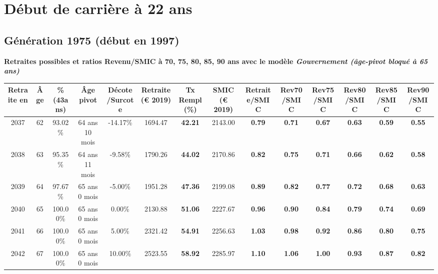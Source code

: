  \addto{\captionsenglish}{ \renewcommand{\mtctitle}{}} \setcounter{minitocdepth}{2} 
 \minitoc \newpage 

\section{Début de carrière à 22 ans} 

\subsection{Génération 1975 (début en 1997)} 

{\bf \noindent Retraites possibles et ratios Revenu/SMIC à 70, 75, 80, 85, 90 ans avec le modèle \emph{Gouvernement (âge-pivot bloqué à 65 ans)}}  
 
\begin{adjustbox}{max width=\textwidth} 
\begin{tabular}[htb]{|c|c||c|c|c||c|c||c||c|c|c|c|c|c|} 
\hline 
 Retraite en &  Âge &  \%(43ans) &  Âge pivot &  Décote/Surcote &  Retraite (\euro{} 2019) &  Tx Rempl(\%) &  SMIC (\euro{} 2019) &  Retraite/SMIC &  Rev70/SMIC &  Rev75/SMIC &  Rev80/SMIC &  Rev85/SMIC &  Rev90/SMIC \\ 
\hline \hline 
 2037 &  62 &  93.02\% &  64 ans 10 mois &  -14.17\% &  1694.47 &  {\bf 42.21} &  2143.00 &  {\bf {\color{red} 0.79}} &  {\bf {\color{red} 0.71}} &  {\bf {\color{red} 0.67}} &  {\bf {\color{red} 0.63}} &  {\bf {\color{red} 0.59}} &  {\bf {\color{red} 0.55}} \\ 
\hline 
 2038 &  63 &  95.35\% &  64 ans 11 mois &  -9.58\% &  1790.26 &  {\bf 44.02} &  2170.86 &  {\bf {\color{red} 0.82}} &  {\bf {\color{red} 0.75}} &  {\bf {\color{red} 0.71}} &  {\bf {\color{red} 0.66}} &  {\bf {\color{red} 0.62}} &  {\bf {\color{red} 0.58}} \\ 
\hline 
 2039 &  64 &  97.67\% &  65 ans 0 mois &  -5.00\% &  1951.28 &  {\bf 47.36} &  2199.08 &  {\bf {\color{red} 0.89}} &  {\bf {\color{red} 0.82}} &  {\bf {\color{red} 0.77}} &  {\bf {\color{red} 0.72}} &  {\bf {\color{red} 0.68}} &  {\bf {\color{red} 0.63}} \\ 
\hline 
 2040 &  65 &  100.00\% &  65 ans 0 mois &  0.00\% &  2130.88 &  {\bf 51.06} &  2227.67 &  {\bf {\color{red} 0.96}} &  {\bf {\color{red} 0.90}} &  {\bf {\color{red} 0.84}} &  {\bf {\color{red} 0.79}} &  {\bf {\color{red} 0.74}} &  {\bf {\color{red} 0.69}} \\ 
\hline 
 2041 &  66 &  100.00\% &  65 ans 0 mois &  5.00\% &  2321.42 &  {\bf 54.91} &  2256.63 &  {\bf 1.03} &  {\bf {\color{red} 0.98}} &  {\bf {\color{red} 0.92}} &  {\bf {\color{red} 0.86}} &  {\bf {\color{red} 0.80}} &  {\bf {\color{red} 0.75}} \\ 
\hline 
 2042 &  67 &  100.00\% &  65 ans 0 mois &  10.00\% &  2523.55 &  {\bf 58.92} &  2285.97 &  {\bf 1.10} &  {\bf 1.06} &  {\bf {\color{red} 1.00}} &  {\bf {\color{red} 0.93}} &  {\bf {\color{red} 0.87}} &  {\bf {\color{red} 0.82}} \\ 
\hline 
\hline 
\end{tabular} 
\end{adjustbox} 
 
